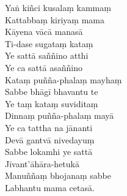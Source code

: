Yaṅ kiñci kusalaṃ kammaṃ\\
Kattabbaṃ kiriyaṃ mama\\
Kāyena vācā manasā\\
Ti-dase sugataṃ kataṃ\\
Ye sattā saññino atthi\\
Ye ca sattā asaññino\\
Kataṃ puñña-phalaṃ mayhaṃ\\
Sabbe bhāgī bhavantu te\\
Ye taṃ kataṃ suviditaṃ\\
Dinnaṃ puñña-phalaṃ mayā\\
Ye ca tattha na jānanti\\
Devā gantvā nivedayuṃ\\
Sabbe lokamhi ye sattā\\
Jīvant’āhāra-hetukā\\
Manuññaṃ bhojanaṃ sabbe\\
Labhantu mama cetasā.

